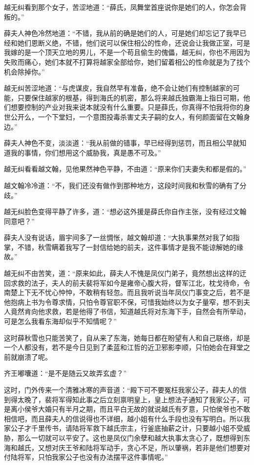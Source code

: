 越无纠看到那个女子，苦涩地道：“薛氏，凤舞堂首座说你是她们的人，你怎会背叛的。”

薛夫人神色冷然地道：“不错，我从前的确是她们的人，可是她们却忘记了我早已经和她们恩断义绝，不错，他们说可以保住相公的性命，还说会让我做正室，可是我嫁的是一个顶天立地的男儿，不是一个苟且偷生的傀儡，越无纠，你也不用因为失败而痛心，她们本就不打算将越家全部给你，她们留着相公的性命就是为了找个机会除掉你。”

越无纠苦涩地道：“与虎谋皮，我自然早有准备，绝不会让她们有控制越家的可能，只要保住越家的根基，得到海氏的机密，那么将来越氏独霸海上指日可期，他们想要控制的产业对我来说本就没有什么重要。只是薛氏，你真得不怕我将你的身世公开么，一个下堂妇，一个意图投毒杀害丈夫子嗣的女人，有何颜面留在文翰身边。”

薛夫人神色不变，淡淡道：“我从前做的错事，早已经得到惩罚，而且相公早就知道我的事情，你们想用这个威胁我，真是愚不可及。”

越无纠看看越文翰，见他果然神色平静，不由道：“原来你们夫妻失和都是假的。”

越文翰冷冷道：“不，我们还没有做作到那种地方，这段时间我和秋雪的确有了分歧。”

越无纠脸色变得平静了许多，道：“想必这外援是薛氏你自作主张，没有经过文翰同意吧？”

薛夫人没有说话，眉宇间多了一丝惆怅，越文翰却道：“大执事果然对我了如指掌，不错，秋雪瞒着我写了一封信给她的前夫，这件事情才是我不能谅解她的缘故。”

越无纠不由苦笑，道：“原来如此，薛夫人不愧是凤仪门弟子，竟然想出这样的迂回求救的法子，夫人的前夫裴将军如今是雍帝心腹大将，督军江北，枕戈待命，令南楚上下无不忧心忡忡，不敢稍有轻忽。而且我听说当年凤仪门事变之后，若不是他抱病上书为令尊求情，只怕令尊官职不保，可惜我始终以为女子量窄，想不到夫人竟然肯向他求救，若是他得了书信，知道越氏将对东海下手，自然会有所举动，可是怎么我看东海却似乎不知情呢？”

这时薛秋雪也只能苦笑了，自从来了东海，她每日都在盼望有人和自己联络，却是一个人都没有，若不是今日见到了柔蓝和江哲的近卫邪影李顺，只怕她会在拜堂之前就崩溃了呢。

齐王嘟囔道：“是不是随云又故弄玄虚？”

这时，门外传来一个清雅冰寒的声音道：“殿下可不要冤枉我家公子，薛夫人的信到得太晚了，裴将军得知此事之后立刻禀明皇上，皇上想法子通知了我家公子，可是离小侯爷大婚只有半月之期，而且平白无故的就说越氏有歹意，只怕侯爷也不敢相信吧，而且薛夫人的信说得也不详细，越小姐有什么手段也没有写明白。所以我家公子才千里传书，请陆将军救下越氏宗主，行釜底抽薪之计，只要越小姐不受威胁，那么一切就可以平安了。这也是凤仪门余孽和越大执事太贪心了，既想得到东海和越氏，又想对庆王爷和陆将军动手，贪心不足，所以肇祸，若非是他们想要对付陆将军，只怕我家公子也没有办法摆平这件事情呢。”

